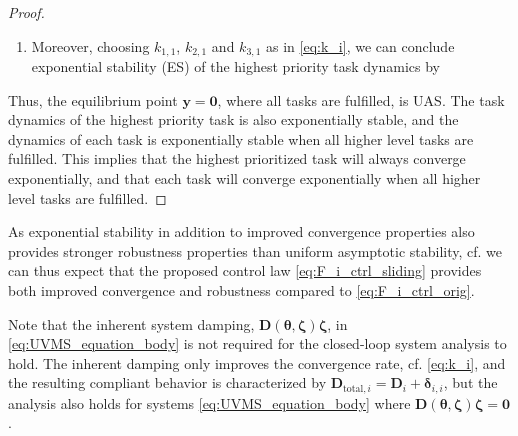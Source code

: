 \documentclass[../main.tex]{subfiles}
\begin{document}
\begin{proof}
\begin{enumerate}



        \item Moreover, choosing $k_{1,1}$, $k_{2,1}$ and $k_{3,1}$ as in \eqref{eq:k_i}, we can conclude exponential stability (ES) of the highest priority task dynamics by \cite[Theorem 4.10]{Khalil2002}
    \end{enumerate}
    Thus, the equilibrium point $\bm{y}=\bm{0}$, where all tasks are fulfilled, is UAS. The task dynamics of the highest priority task is also exponentially stable, and the dynamics of each task is exponentially stable when all higher level tasks are fulfilled. This implies that the highest prioritized task will always converge  exponentially, and that each task will converge exponentially when all higher level tasks are fulfilled.
\end{proof}
\begin{remark}
    As exponential stability in addition to improved convergence properties also provides stronger robustness properties than uniform asymptotic stability, cf. \cite[Lemmas 9.2 and 9.3]{Khalil2002} we can thus expect that the proposed control law \eqref{eq:F_i_ctrl_sliding} provides both improved convergence and robustness compared to \eqref{eq:F_i_ctrl_orig}.
\end{remark}

\begin{remark}
    Note that the inherent system damping, $\bm{D}(\bm{\theta}, \bm{\zeta})\bm{\zeta}$, in \eqref{eq:UVMS_equation_body} is not required for the closed-loop system analysis to hold. The inherent damping only improves the convergence rate, cf. \eqref{eq:k_i}, and the resulting compliant behavior is characterized by $\bm{D}_{\text{total}, i}= \bm{D}_i + \bm{\delta}_{i,i}$, but the analysis also holds for systems \eqref{eq:UVMS_equation_body} where $\bm{D}(\bm{\theta}, \bm{\zeta})\bm{\zeta}=\bm{0}$.
\end{remark}
\end{document}
